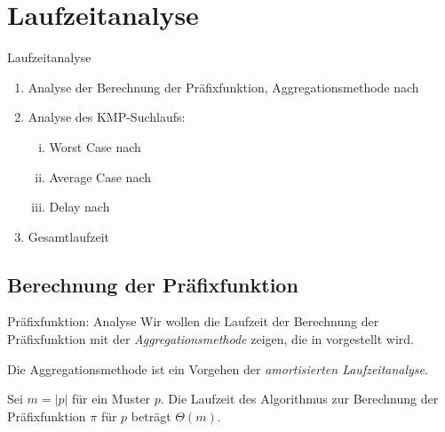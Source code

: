 \documentclass[xcolor=dvipsnames, aspectratio=169]{beamer}
\begin{document}
\section{Laufzeitanalyse}

\begin{frame}{Laufzeitanalyse}

\begin{enumerate}[(1)]
\item Analyse der Berechnung der Präfixfunktion, Aggregationsmethode nach \cite{cormenalgorithms2009}
\item Analyse des KMP-Suchlaufs:

\begin{enumerate}[(i)]
\item Worst Case nach \cite{jewels}
\item Average Case nach \cite{Regnier89}
\item Delay nach \cite{KnuthMorrisPratt1977}
\end{enumerate}
\item Gesamtlaufzeit
\end{enumerate}
\end{frame}

\subsection{Berechnung der Präfixfunktion}


\begin{frame}{Präfixfunktion: Analyse}
Wir wollen die Laufzeit der Berechnung der Präfixfunktion mit der \emph{Aggregationsmethode} zeigen, die in \cite{cormenalgorithms2009} vorgestellt wird.\medskip

Die Aggregationsmethode ist ein Vorgehen der \emph{amortisierten Laufzeitanalyse}.\bigskip\pause

\begin{theo}
Sei $m=\vert p\vert$ für ein Muster $p$. Die Laufzeit des Algorithmus zur Berechnung der Präfixfunktion $\pi$ für $p$ beträgt $\Theta(m)$.
\end{theo}
\end{frame}
\end{document}

